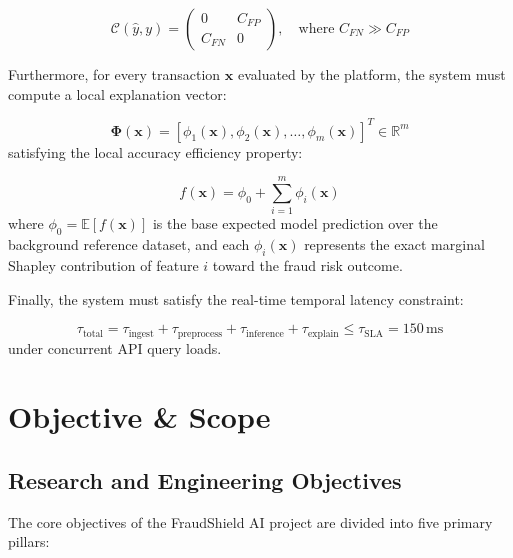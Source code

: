 \documentclass[12pt,a4paper,oneside]{report}
\begin{document}
\begin{equation}
\mathcal{C}(\hat{y}, y) = \begin{pmatrix} 0 & C_{FP} \\ C_{FN} & 0 \end{pmatrix}, \quad \text{where } C_{FN} \gg C_{FP}
\end{equation}

Furthermore, for every transaction $\mathbf{x}$ evaluated by the platform, the system must compute a local explanation vector:

\begin{equation}
\boldsymbol{\Phi}(\mathbf{x}) = [\phi_1(\mathbf{x}), \phi_2(\mathbf{x}), \dots, \phi_m(\mathbf{x})]^T \in \mathbb{R}^m
\end{equation}
satisfying the local accuracy efficiency property:

\begin{equation}
f(\mathbf{x}) = \phi_0 + \sum_{i=1}^m \phi_i(\mathbf{x})
\end{equation}
where $\phi_0 = \mathbb{E}[f(\mathbf{x})]$ is the base expected model prediction over the background reference dataset, and each $\phi_i(\mathbf{x})$ represents the exact marginal Shapley contribution of feature $i$ toward the fraud risk outcome.


Finally, the system must satisfy the real-time temporal latency constraint:

\begin{equation}
\tau_{\text{total}} = \tau_{\text{ingest}} + \tau_{\text{preprocess}} + \tau_{\text{inference}} + \tau_{\text{explain}} \le \tau_{\text{SLA}} = 150\,\text{ms}
\end{equation}
under concurrent API query loads.



\section{Objective \& Scope}

\subsection{Research and Engineering Objectives}

The core objectives of the FraudShield AI project are divided into five primary pillars:
\end{document}
